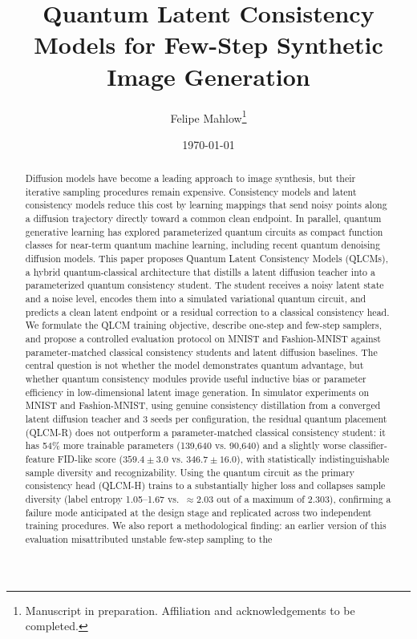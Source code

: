 \documentclass[11pt]{article}
\title{Quantum Latent Consistency Models for Few-Step Synthetic Image Generation}
\author{Felipe Mahlow\thanks{Manuscript in preparation. Affiliation and acknowledgements to be completed.}}
\date{\today}
\begin{document}
\maketitle

\begin{abstract}
Diffusion models have become a leading approach to image synthesis, but their
iterative sampling procedures remain expensive. Consistency models and latent
consistency models reduce this cost by learning mappings that send noisy points
along a diffusion trajectory directly toward a common clean endpoint. In
parallel, quantum generative learning has explored parameterized quantum circuits
as compact function classes for near-term quantum machine learning, including
recent quantum denoising diffusion models. This paper proposes Quantum Latent
Consistency Models (QLCMs), a hybrid quantum-classical architecture that
distills a latent diffusion teacher into a parameterized quantum consistency
student. The student receives a noisy latent state and a noise level, encodes
them into a simulated variational quantum circuit, and predicts a clean latent
endpoint or a residual correction to a classical consistency head. We formulate
the QLCM training objective, describe one-step and few-step samplers, and propose
a controlled evaluation protocol on MNIST and Fashion-MNIST against
parameter-matched classical consistency students and latent diffusion baselines.
The central question is not whether the model demonstrates quantum advantage,
but whether quantum consistency modules provide useful inductive bias or
parameter efficiency in low-dimensional latent image generation. In simulator
experiments on MNIST and Fashion-MNIST, using genuine consistency
distillation from a converged latent diffusion teacher and 3 seeds per
configuration, the residual quantum placement (QLCM-R) does not outperform a
parameter-matched classical consistency student: it has 54\% more trainable
parameters (139{,}640 vs. 90{,}640) and a slightly worse classifier-feature
FID-like score ($359.4\pm3.0$ vs. $346.7\pm16.0$), with statistically
indistinguishable sample diversity and recognizability. Using the quantum
circuit as the primary consistency head (QLCM-H) trains to a substantially
higher loss and collapses sample diversity (label entropy 1.05--1.67 vs.\
$\approx$2.03 out of a maximum of 2.303), confirming a failure mode
anticipated at the design stage and replicated across two independent
training procedures. We also report a methodological finding: an earlier
version of this evaluation misattributed unstable few-step sampling to the

\end{abstract}
\end{document}
